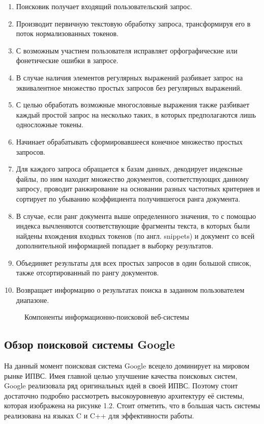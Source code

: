 \begin{itemize}
\begin{enumerate}
\item Поисковик получает входящий пользовательский запрос.
\item Производит первичную текстовую обработку запроса, трансформируя его в поток нормализованных токенов.
\item С возможным участием пользователя исправляет орфографические или фонетические ошибки в запросе.
\item В случае наличия элементов регулярных выражений разбивает запрос на эквивалентное множество простых запросов без регулярных выражений.
\item С целью обработать возможные многословные выражения также разбивает каждый простой запрос на несколько таких, в которых предполагаются лишь односложные токены.
\item Начинает обрабатывать сформировавшееся конечное множество простых запросов.
\item Для каждого запроса обращается к базам данных, декодирует индексные файлы, по ним находит множество документов, соответствующих данному запросу, проводит ранжирование на основании разных частотных критериев и сортирует по убыванию коэффициента получившегося ранга документа.
\item В случае, если ранг документа выше определенного значения, то с помощью индекса вычленяются соответствующие фрагменты текста, в которых были найдены вхождения входных токенов (по англ. snippets) и документ со всей дополнительной информацией попадает в выборку результатов.
\item Объединяет результаты для всех простых запросов в один большой список, также отсортированный по рангу документов.
\item Возвращает информацию о результатах поиска в заданном пользователем диапазоне.
\end{enumerate}
\end{itemize}

\begin{figure}[H]
\caption{Компоненты информационно-поисковой веб-системы}
\label{irws_comps:image}
\end{figure}

\subsection{Обзор поисковой системы Google}
На данный момент поисковая система Google всецело доминирует на мировом рынке ИПВС. Имея главной целью улучшение качества поисковых систем, Google реализовала ряд оригинальных идей в своей ИПВС. Поэтому стоит достаточно подробно рассмотреть высокоуровневую архитектуру её системы, которая изображена на рисунке 1.2. Стоит отметить, что в большая часть системы реализована на языках C и C++ для эффективности работы.

